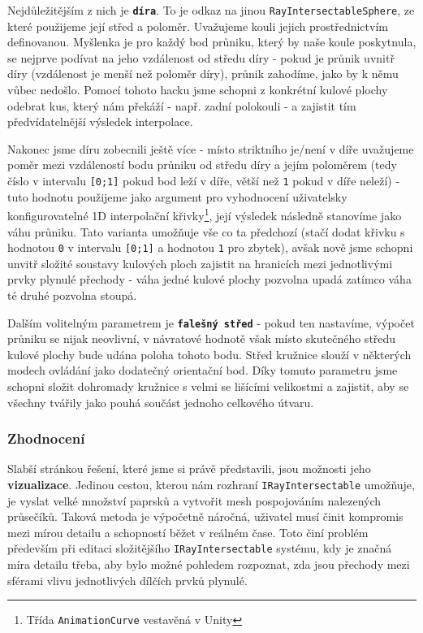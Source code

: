 Nejdůležitějším z nich je \textbf{\texttt{díra}}. To je odkaz na jinou \texttt{RayIntersectableSphere}, ze které použijeme její střed a poloměr. Uvažujeme kouli jejich prostřednictvím definovanou. Myšlenka je pro každý bod průniku, který by naše koule poskytnula, se nejprve podívat na jeho vzdálenost od středu díry - pokud je průnik uvnitř díry (vzdálenost je menší než poloměr díry), průnik zahodíme, jako by k němu vůbec nedošlo. Pomocí tohoto hacku jsme schopni z konkrétní kulové plochy odebrat kus, který nám překáží - např. zadní polokouli - a zajistit tím předvídatelnější výsledek interpolace.

Nakonec jsme díru zobecnili ještě více - místo striktního je/není v díře uvažujeme poměr mezi vzdáleností bodu průniku od středu díry a jejím poloměrem (tedy číslo v intervalu \texttt{[0;1]} pokud bod leží v díře, větší než \texttt{1} pokud v díře neleží) - tuto hodnotu použijeme jako argument pro vyhodnocení uživatelsky konfigurovatelné 1D interpolační křivky\footnote{Třída \texttt{AnimationCurve} vestavěná v Unity}, její výsledek následně stanovíme jako váhu průniku. Tato varianta umožňuje vše co ta předchozí (stačí dodat křivku s hodnotou \texttt{0} v intervalu \texttt{[0;1]} a hodnotou \texttt{1} pro zbytek), avšak nově jsme schopni unvitř složité soustavy kulových ploch zajistit na hranicích mezi jednotlivými prvky plynulé přechody - váha jedné kulové plochy pozvolna upadá zatímco váha té druhé pozvolna stoupá.

Dalším volitelným parametrem je \textbf{\texttt{falešný střed}} - pokud ten nastavíme, výpočet průniku se nijak neovlivní, v návratové hodnotě však místo skutečného středu kulové plochy bude udána poloha tohoto bodu. Střed kružnice slouží v některých modech ovládání jako dodatečný orientační bod. Díky tomuto parametru jsme schopni složit dohromady kružnice s velmi se lišícími velikostmi a zajistit, aby se všechny tvářily jako pouhá součást jednoho celkového útvaru. 


\subsubsection*{Zhodnocení}

Slabší stránkou řešení, které jsme si právě představili, jsou možnosti jeho \textbf{vizualizace}. Jedinou cestou, kterou nám rozhraní \texttt{IRayIntersectable} umožňuje, je vyslat velké množství paprsků a vytvořit mesh pospojováním nalezených průsečíků. Taková metoda je výpočetně náročná, uživatel musí činit kompromis mezi mírou detailu a schopností běžet v reálném čase. Toto činí problém především při editaci složitějšího \texttt{IRayIntersectable} systému, kdy je značná míra detailu třeba, aby bylo možné pohledem rozpoznat, zda jsou přechody mezi sférami vlivu jednotlivých dílčích prvků plynulé. 

